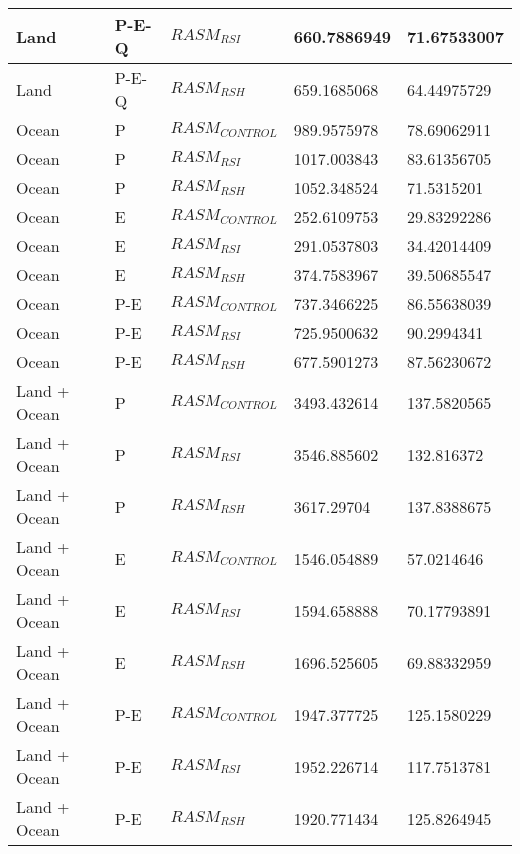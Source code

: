 \begin{table}[]
{\begin{tabular}{|l|l|l|l|l|}
Land          & P-E-Q             & $RASM_{RSI}$        & 660.7886949         & 71.67533007           \\ \hline
Land          & P-E-Q             & $RASM_{RSH}$        & 659.1685068         & 64.44975729           \\ \hline
Ocean         & P                 & $RASM_{CONTROL}$    & 989.9575978         & 78.69062911           \\ \hline
Ocean         & P                 & $RASM_{RSI}$        & 1017.003843         & 83.61356705           \\ \hline
Ocean         & P                 & $RASM_{RSH}$        & 1052.348524         & 71.5315201            \\ \hline
Ocean         & E                 & $RASM_{CONTROL}$    & 252.6109753         & 29.83292286           \\ \hline
Ocean         & E                 & $RASM_{RSI}$        & 291.0537803         & 34.42014409           \\ \hline
Ocean         & E                 & $RASM_{RSH}$        & 374.7583967         & 39.50685547           \\ \hline
Ocean         & P-E               & $RASM_{CONTROL}$    & 737.3466225         & 86.55638039           \\ \hline
Ocean         & P-E               & $RASM_{RSI}$        & 725.9500632         & 90.2994341            \\ \hline
Ocean         & P-E               & $RASM_{RSH}$        & 677.5901273         & 87.56230672           \\ \hline
Land + Ocean  & P                 & $RASM_{CONTROL}$    & 3493.432614         & 137.5820565           \\ \hline
Land + Ocean  & P                 & $RASM_{RSI}$        & 3546.885602         & 132.816372            \\ \hline
Land + Ocean  & P                 & $RASM_{RSH}$        & 3617.29704          & 137.8388675           \\ \hline
Land + Ocean  & E                 & $RASM_{CONTROL}$    & 1546.054889         & 57.0214646            \\ \hline
Land + Ocean  & E                 & $RASM_{RSI}$        & 1594.658888         & 70.17793891           \\ \hline
Land + Ocean  & E                 & $RASM_{RSH}$        & 1696.525605         & 69.88332959           \\ \hline
Land + Ocean  & P-E               & $RASM_{CONTROL}$    & 1947.377725         & 125.1580229           \\ \hline
Land + Ocean  & P-E               & $RASM_{RSI}$        & 1952.226714         & 117.7513781           \\ \hline
Land + Ocean  & P-E               & $RASM_{RSH}$        & 1920.771434         & 125.8264945           \\ \hline
\end{tabular}
}
\end{table}
